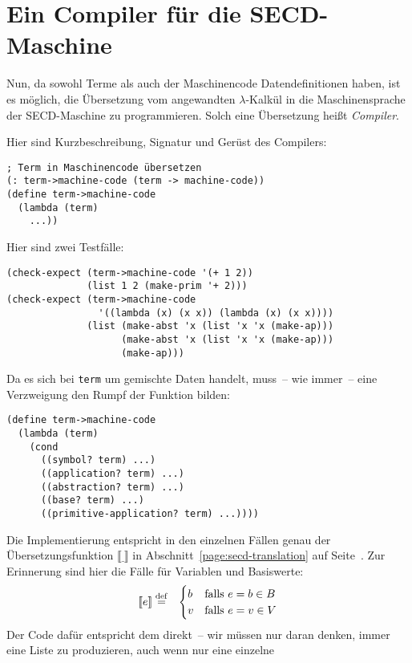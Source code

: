 \section{Ein Compiler für die SECD-Maschine}

Nun, da sowohl Terme als auch der Maschinencode Datendefinitionen
haben, ist es möglich, die Übersetzung vom angewandten
$\lambda$-Kalkül in die Maschinensprache der SECD-Maschine zu
programmieren.  Solch eine Übersetzung heißt \textit{Compiler}.

Hier sind Kurzbeschreibung, Signatur und Gerüst des Compilers:
%
\begin{lstlisting}
; Term in Maschinencode übersetzen
(: term->machine-code (term -> machine-code))
(define term->machine-code
  (lambda (term)
    ...))
\end{lstlisting}
%
Hier sind zwei Testfälle:
%
\begin{lstlisting}
(check-expect (term->machine-code '(+ 1 2))
              (list 1 2 (make-prim '+ 2)))
(check-expect (term->machine-code 
                '((lambda (x) (x x)) (lambda (x) (x x))))
              (list (make-abst 'x (list 'x 'x (make-ap)))
                    (make-abst 'x (list 'x 'x (make-ap)))
                    (make-ap)))
\end{lstlisting}
%
Da es sich bei \lstinline{term} um gemischte Daten handelt, muss~-- wie
immer~-- eine Verzweigung den Rumpf der Funktion bilden:
%
\begin{lstlisting}
(define term->machine-code
  (lambda (term)
    (cond
      ((symbol? term) ...)
      ((application? term) ...)
      ((abstraction? term) ...)
      ((base? term) ...)
      ((primitive-application? term) ...))))
\end{lstlisting}
%
Die Implementierung entspricht in den einzelnen Fällen genau der
Übersetzungsfunktion $\llbracket\underline{~}\rrbracket$ in
Abschnitt~\ref{page:secd-translation} auf
Seite~\pageref{page:secd-translation}. Zur Erinnerung sind hier die Fälle für Variablen und
Basiswerte:
\begin{eqnarray*}
    \llbracket e \rrbracket &\stackrel{\rm def}{=}&
  \begin{cases}
    b & \textrm{falls $e = b \in B$}\\
    v & \textrm{falls $e = v \in V$}\\
  \end{cases}
\end{eqnarray*}
%
Der Code dafür entspricht dem direkt~-- wir müssen nur daran denken,
immer eine Liste zu produzieren, auch wenn nur eine einzelne
